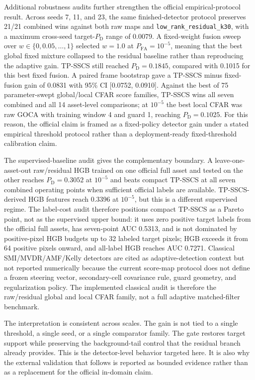 \documentclass[journal]{IEEEtran}
\begin{document}
Additional robustness audits further strengthen the official empirical-protocol result. Across seeds 7, 11, and 23, the same finished-detector protocol preserves 21/21 combined wins against both raw maps and \texttt{low\_rank\_residual\_k30}, with a maximum cross-seed target-$P_{\mathrm{D}}$ range of 0.0079. A fixed-weight fusion sweep over $w\in\{0,0.05,\ldots,1\}$ selected $w=1.0$ at $P_{\mathrm{FA}}=10^{-5}$, meaning that the best global fixed mixture collapsed to the residual baseline rather than reproducing the adaptive gain. TP-SSCS still reached $P_{\mathrm{D}}=0.1845$, compared with 0.1015 for this best fixed fusion. A paired frame bootstrap gave a TP-SSCS minus fixed-fusion gain of 0.0831 with 95\% CI [0.0752, 0.0910]. Against the best of 75 parameter-swept global/local CFAR score families, TP-SSCS wins all seven combined and all 14 asset-level comparisons; at $10^{-5}$ the best local CFAR was raw GOCA with training window 4 and guard 1, reaching $P_{\mathrm{D}}=0.1025$. For this reason, the official claim is framed as a fixed-policy detector gain under a stated empirical threshold protocol rather than a deployment-ready fixed-threshold calibration claim.

The supervised-baseline audit gives the complementary boundary. A leave-one-asset-out raw/residual HGB trained on one official full asset and tested on the other reaches $P_{\mathrm{D}}=0.3052$ at $10^{-5}$ and beats compact TP-SSCS at all seven combined operating points when sufficient official labels are available. TP-SSCS-derived HGB features reach 0.3396 at $10^{-5}$, but this is a different supervised regime. The label-cost audit therefore positions compact TP-SSCS as a Pareto point, not as the supervised upper bound: it uses zero positive target labels from the official full assets, has seven-point AUC 0.5313, and is not dominated by positive-pixel HGB budgets up to 32 labeled target pixels; HGB exceeds it from 64 positive pixels onward, and all-label HGB reaches AUC 0.7271. Classical SMI/MVDR/AMF/Kelly detectors are cited as adaptive-detection context but not reported numerically because the current score-map protocol does not define a frozen steering vector, secondary-cell covariance rule, guard geometry, and regularization policy. The implemented classical audit is therefore the raw/residual global and local CFAR family, not a full adaptive matched-filter benchmark.

The interpretation is consistent across scales. The gain is not tied to a single threshold, a single seed, or a single comparator family. The gate restores target support while preserving the background-tail control that the residual branch already provides. This is the detector-level behavior targeted here. It is also why the external validation that follows is reported as bounded evidence rather than as a replacement for the official in-domain claim.
\end{document}
